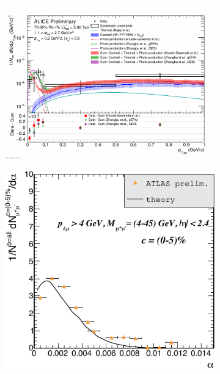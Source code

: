 \documentclass[12pt,epjc3]{svjour3}\sloppy
\begin{document}
\begin{figure}
    \centering
    \begin{subfigure}{.57\textwidth}
      \centering
      \includegraphics[width=.99\linewidth]{fig/fig_10-crop.pdf}
      \caption{}
    \end{subfigure}%
    \begin{subfigure}{.43\textwidth}
      \centering
      \includegraphics[width=.99\linewidth]{fig/fig_11-crop.pdf}
      \caption{}
    \end{subfigure}
 

\end{figure}
\end{document}
